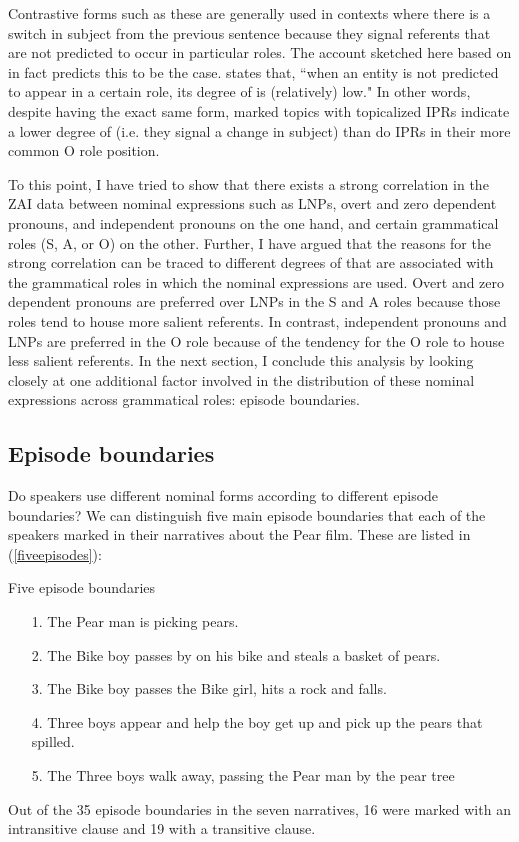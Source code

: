 Contrastive forms such as these are generally used in contexts where there is a switch in subject from the previous sentence because they signal referents that are not predicted to occur in particular roles. The account sketched here based on  in fact predicts this to be the case. \citet[37]{ariel2001} states that, ``when an entity is not predicted to appear in a certain role, its degree of  is (relatively) low." In other words, despite having the exact same form, marked topics with topicalized IPRs indicate a lower degree of  (i.e. they signal a change in subject) than do IPRs in their more common O role position. 

To this point, I have tried to show that there exists a strong correlation in the ZAI data between nominal expressions such as LNPs, overt and zero dependent pronouns, and independent pronouns on the one hand, and certain grammatical roles (S, A, or O) on the other. Further, I have argued that the reasons for the strong correlation can be traced to different degrees of  that are associated with the grammatical roles in which the nominal expressions are used. Overt and zero dependent pronouns are preferred over LNPs in the S and A roles because those roles tend to house more salient referents. In contrast, independent pronouns and LNPs are preferred in the O role because of the tendency for the O role to house less salient referents. In the next section, I conclude this analysis by looking closely at one additional factor involved in the distribution of these nominal expressions across grammatical roles: episode boundaries.


\subsection{Episode boundaries}\label{episodeboundaries}

Do speakers use different nominal forms according to different episode boundaries? We can distinguish five main episode boundaries that each of the speakers marked in their narratives about the Pear film. These are listed in (\ref{fiveepisodes}):

\ea\label{fiveepisodes} Five episode boundaries
\begin{itemize}
\item[1.] The Pear man is picking pears. 
\item[2.] The Bike boy passes by on his bike and steals a basket of pears. 
\item[3.] The Bike boy passes the Bike girl, hits a rock and falls. 
\item[4.] Three boys appear and help the boy get up and pick up the pears that spilled.
\item[5.] The Three boys walk away, passing the Pear man by the pear tree
\end{itemize}
\z
Out of the 35 episode boundaries in the seven narratives, 16 were marked with an intransitive clause and 19 with a transitive clause.

